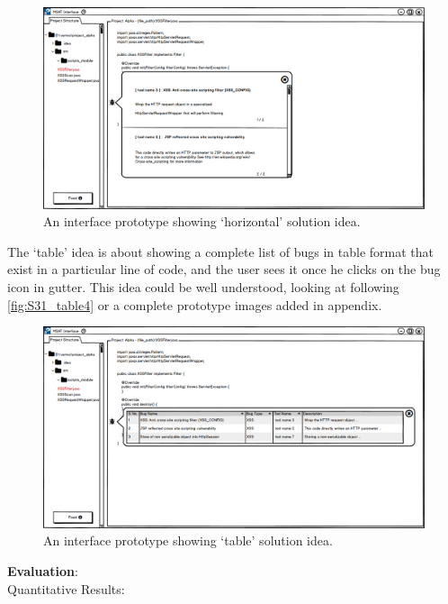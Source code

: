 \begin{figure}[hbt!]
	\centering
	\includegraphics[width=\linewidth]{figures/solution_ideas_snaps/S31_horizontal}
	\caption{An interface prototype showing ‘horizontal’ solution idea.}
	\label{fig:S31_horizontal4}
\end{figure} 

The ‘table’ idea is about showing a complete list of bugs in table format that exist in a particular line of code, and the user sees it once he clicks on the bug icon in gutter. This idea could be well understood, looking at following \autoref{fig:S31_table4} or a complete prototype images added in appendix. \\

\begin{figure}[hbt!]
	\centering
	\includegraphics[width=\linewidth]{figures/solution_ideas_snaps/S31_table}
	\caption{An interface prototype showing ‘table’ solution idea.}
	\label{fig:S31_table4}
\end{figure} 


\textbf{Evaluation}: \\

Quantitative Results: \\

